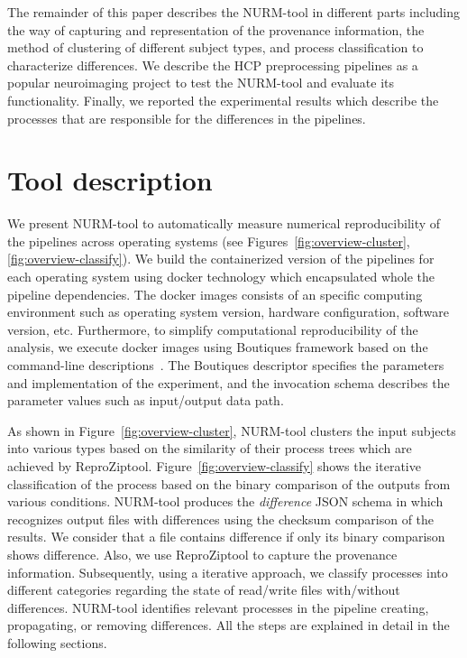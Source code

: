 \documentclass[a4paper,num-refs]{oup-contemporary}
\newcommand{\reprozip}[0]{ReproZip}
\begin{document}
The remainder of this paper describes the NURM-tool in different parts 
including the way of capturing and representation of the provenance 
information, the method of clustering of different subject types, and 
process classification to characterize differences. We describe the HCP 
preprocessing pipelines as a popular neuroimaging project to test the 
NURM-tool and evaluate its functionality. Finally, we reported the 
experimental results which describe the processes that are responsible 
for the differences in the pipelines.


\section{Tool description}

We present NURM-tool to automatically measure numerical reproducibility 
of the pipelines across operating systems (see 
Figures~\ref{fig:overview-cluster}, \ref{fig:overview-classify}). We build the 
containerized version of the pipelines for each operating system using 
docker technology which encapsulated whole the pipeline dependencies. 
The docker images consists of an specific computing environment such as 
operating system version, hardware configuration, software version, 
etc. Furthermore, to simplify computational reproducibility of the 
analysis, we execute docker images using Boutiques framework based on 
the command-line descriptions~\cite{glatard2017boutiques}. The 
Boutiques descriptor specifies the parameters and implementation of the 
experiment, and the invocation schema describes the parameter values 
such as input/output data path.

As shown in Figure~\ref{fig:overview-cluster}, NURM-tool clusters the 
input subjects into various types based on the similarity of their 
process trees which are achieved by \reprozip tool. 
Figure~\ref{fig:overview-classify} shows the iterative classification 
of the process based on the binary comparison of the outputs from 
various conditions. NURM-tool produces the \textit{difference} JSON 
schema in which recognizes output files with differences using the 
checksum comparison of the results. We consider that a file contains 
difference if only its binary comparison shows difference. Also, we use 
\reprozip tool to capture the provenance information. Subsequently, 
using a iterative approach, we classify processes into different 
categories regarding the state of read/write files with/without 
differences. NURM-tool identifies relevant processes in the pipeline 
creating, propagating, or removing differences. All the steps are 
explained in detail in the following sections.
\end{document}
